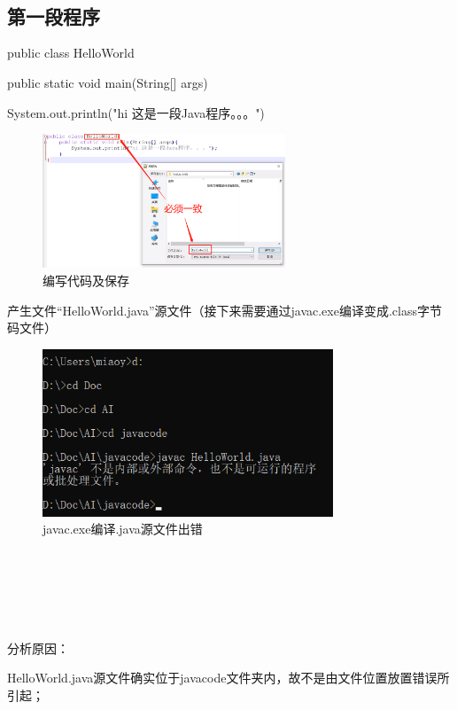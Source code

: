 \documentclass{article}
\begin{document}
	\ 
	
	\ 
	
	\subsection{第一段程序}
	
	public class HelloWorld{
		
		\setlength{\parindent}{6em}public static void main(String[] args){
		
			\setlength{\parindent}{8em}System.out.println("hi 这是一段Java程序。。。")
	
		}
		
	}
	
	\begin{figure}[ht]
		\centering
		\includegraphics[height=40mm]{6.png}
		\caption{编写代码及保存}
		\label{fig:label}
	\end{figure}
	
	\setlength{\parindent}{2em}
	产生文件“HelloWorld.java”源文件（接下来需要通过javac.exe编译变成.class字节码文件）
	
	\begin{figure}[hb]
		\centering
		\includegraphics[height=50mm]{7.png}
		\caption{javac.exe编译.java源文件出错}
		\label{fig:label}
	\end{figure}
	
	\ 
	
	\ 
	
	\ 
	
	分析原因：
	
	\setlength{\parindent}{4em}
	HelloWorld.java源文件确实位于javacode文件夹内，故不是由文件位置放置错误所引起；
	
\end{document}

